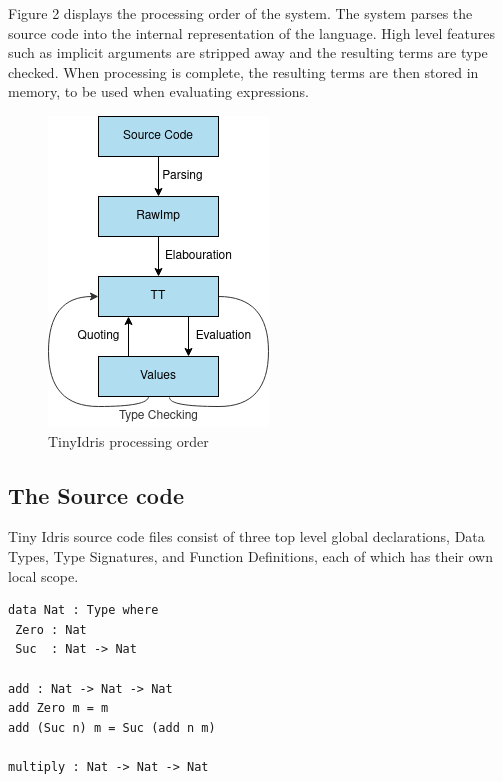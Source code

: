 \documentclass[a4paper]{article}
\begin{document}
Figure 2 displays the processing order of the system.
The system parses the source code into the internal representation of
the language. High level features such as implicit arguments are
stripped away and the resulting terms are type checked. When processing
is complete, the resulting terms are then stored in memory, to be used
when evaluating expressions.

\begin{center}
\begin{figure}[htbp]
\centering
\includegraphics[scale=0.60]{./Resource/main.png}
\caption{TinyIdris processing order}
\end{figure}
\end{center}

\subsection{The Source code}
\label{sec:org85decd2}
Tiny Idris source code files consist of three top level global 
declarations, Data Types, Type Signatures, and Function Definitions,
each of which has their own local scope. 

\begin{center}
\begin{verbatim}
data Nat : Type where
 Zero : Nat
 Suc  : Nat -> Nat

add : Nat -> Nat -> Nat
add Zero m = m
add (Suc n) m = Suc (add n m) 

multiply : Nat -> Nat -> Nat
\end{verbatim}
\end{center}
\end{document}
